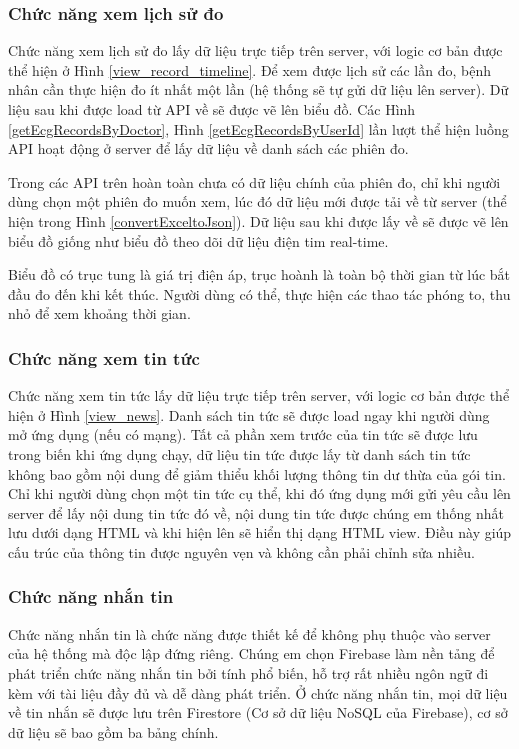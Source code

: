 \subsubsection{Chức năng xem lịch sử đo}
\label{function_view_history_record}


Chức năng xem lịch sử đo lấy dữ liệu trực tiếp trên server, với logic cơ bản được thể hiện ở Hình \ref{view_record_timeline}. 
Để xem được lịch sử các lần đo, bệnh nhân cần thực hiện đo ít nhất một lần (hệ thống sẽ tự gửi dữ liệu lên server). Dữ liệu sau khi được
load từ API về sẽ được vẽ lên biểu đồ. Các Hình \ref{getEcgRecordsByDoctor}, Hình \ref{getEcgRecordsByUserId}
lần lượt thể hiện luồng API hoạt động ở server để lấy dữ liệu về danh sách các phiên đo. 

Trong các API trên hoàn toàn chưa có dữ liệu chính của phiên đo, chỉ khi người dùng chọn một phiên đo muốn xem, lúc đó dữ liệu
mới được tải về từ server (thể hiện trong Hình \ref{convertExceltoJson}). Dữ liệu sau khi được lấy về sẽ được vẽ lên biểu đồ giống
như biểu đồ theo dõi dữ liệu điện tim real-time.

Biểu đồ có trục tung là giá trị điện áp, trục hoành là toàn bộ thời gian từ lúc bắt đầu đo đến khi kết thúc. Người dùng có thể,
thực hiện các thao tác phóng to, thu nhỏ để xem khoảng thời gian.

\subsubsection{Chức năng xem tin tức}

Chức năng xem tin tức lấy dữ liệu trực tiếp trên server, với logic cơ bản được thể hiện ở Hình \ref{view_news}. 
Danh sách tin tức sẽ được load ngay khi người dùng mở ứng dụng (nếu có mạng). Tất cả phần xem trước của tin tức sẽ được lưu
trong biến khi ứng dụng chạy, dữ liệu tin tức được lấy từ danh sách tin tức không bao gồm nội dung để giảm thiểu khối lượng
thông tin dư thừa của gói tin. Chỉ khi người dùng chọn một tin tức cụ thể, khi đó ứng dụng mới gửi yêu cầu lên server để lấy
nội dung tin tức đó về, nội dung tin tức được chúng em thống nhất lưu dưới dạng HTML và khi hiện lên sẽ hiển thị dạng HTML view.
Điều này giúp cấu trúc của thông tin được nguyên vẹn và không cần phải chỉnh sửa nhiều.

\subsubsection{Chức năng nhắn tin}

Chức năng nhắn tin là chức năng được thiết kế để không phụ thuộc vào server của hệ thống mà độc lập đứng riêng. Chúng em
chọn Firebase làm nền tảng để phát triển chức năng nhắn tin bởi tính phổ biến, hỗ trợ rất nhiều ngôn ngữ đi kèm với tài liệu đầy đủ 
và dễ dàng phát triển.
Ở chức năng nhắn tin, mọi dữ liệu về tin nhắn sẽ được lưu trên Firestore (Cơ sở dữ liệu NoSQL của Firebase), cơ sở dữ liệu sẽ
bao gồm ba bảng chính. 

